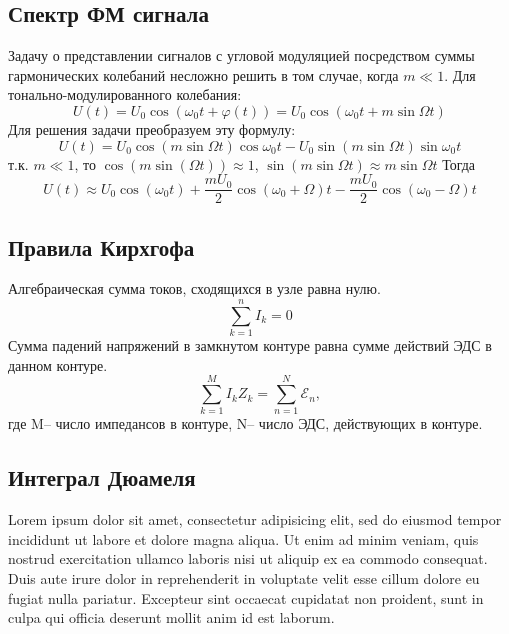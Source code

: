 \documentclass[a4paper,14pt]{extarticle}
\newcommand{\eds}{\ensuremath{\mathscr{E}}} %
\theoremstyle{definition}
\begin{document}
\subsection{Спектр ФМ сигнала}
Задачу о представлении сигналов с угловой модуляцией посредством суммы
гармонических колебаний несложно решить в том случае, когда $m\ll1$. Для
тонально-модулированного колебания:
\begin{equation}
	U(t)=U_0\cos(\omega_0t+\varphi(t))=U_0\cos(\omega_0t+m\sin \Omega t)
\end{equation}
Для решения задачи преобразуем эту формулу:
\begin{equation}
	U(t)=
	U_0\cos(m\sin \Omega t)\cos\omega_0 t-
	U_0\sin(m\sin \Omega t)\sin \omega_0 t
\end{equation}
т.к. $m\ll1$, то $\cos(m\sin(\Omega t))\approx 1$, 
$\sin(m\sin \Omega t)\approx m\sin \Omega t$
Тогда
\begin{equation}
	U(t)\approx 
	U_0\cos(\omega_0 t)+ \frac{mU_0}{2}\cos(\omega_0+\Omega)t-
	\frac{mU_0}{2}\cos(\omega_0- \Omega	)t
\end{equation}
\subsection{Правила Кирхгофа}
Алгебраическая сумма токов, сходящихся в узле равна нулю.
\begin{equation}
	\sum\limits_{k=1}^n I_k=0
\end{equation}
Сумма падений напряжений в замкнутом контуре равна сумме действий ЭДС в данном контуре.
\begin{equation}
	\sum\limits^M_{k=1} I_k Z_k=\sum\limits_{n=1}^N \eds_n,
\end{equation}
где M-- число импедансов в контуре, N-- число ЭДС, действующих в контуре.



\subsection{Интеграл Дюамеля}

Lorem ipsum dolor sit amet, consectetur adipisicing elit, sed do eiusmod
tempor incididunt ut labore et dolore magna aliqua. Ut enim ad minim veniam,
quis nostrud exercitation ullamco laboris nisi ut aliquip ex ea commodo
consequat. Duis aute irure dolor in reprehenderit in voluptate velit esse
cillum dolore eu fugiat nulla pariatur. Excepteur sint occaecat cupidatat non
proident, sunt in culpa qui officia deserunt mollit anim id est laborum.
\end{document}
